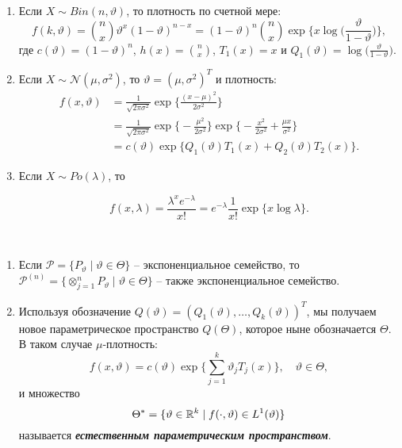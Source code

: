 \begin{exmp}\label{exmp2.34} \
	\begin{enumerate}
		\item Если $X \sim Bin(n, \vartheta)$, то плотность по счетной мере:
		\[ f(k, \vartheta)=\binom{n}{x} \vartheta^x(1-\vartheta)^{n-x}=(1-\vartheta)^n \binom{n}{x} \exp\Big\{x \log\Big(\frac{\vartheta}{1-\vartheta}\Big) \Big\},  \]
		где $c(\vartheta) = (1 - \vartheta)^n$, $h(x)=\binom{n}{x}$, $T_1(x) = x$ и $Q_1(\vartheta) = \log\Big(\frac{\vartheta}{1-\vartheta}\Big)$.
		\item Если $X \sim \mathcal{N}(\mu, \sigma^2)$, то $\vartheta=(\mu, \sigma^2)^T$ и плотность:
		\[ 
		\begin{aligned}
		f(x,\vartheta)&=\frac{1}{\sqrt{2 \pi \sigma^2}} \exp\Big\{ \frac{(x-\mu)^2}{2\sigma^2} \Big\} \\
		& = \frac{1}{\sqrt{2 \pi \sigma^2}} \exp \Big \{ -\frac{\mu^2}{2\sigma^2} \Big\}  \exp\Big \{ -\frac{x^2}{2\sigma^2} +\frac{\mu x}{\sigma^2} \Big\} \\
		& = c(\vartheta) \exp \Big\{ Q_1(\vartheta) T_1(x) + Q_2(\vartheta) T_2(x)  \Big \} .
		\end{aligned}  \]
		
		\item Если $X \sim Po(\lambda)$, то

		\[ f(x, \lambda) = \frac{\lambda^x e^{-\lambda}}{x!}=e^{-\lambda} \frac{1}{x!} \exp\{x \log \lambda \}. \]
    \end{enumerate}
\end{exmp}

\begin{rmrk}\
	\begin{enumerate}
		\item Если $\mathcal{P} = \{P_\vartheta \mid \vartheta \in \Theta \}$ -- экспоненциальное семейство, то $\mathcal{P}^{(n)}=\{ \otimes_{j=1}^n P_\vartheta \mid \vartheta \in \Theta \}$ -- также экспоненциальное семейство.
		\item Используя обозначение $Q(\vartheta) = (Q_1(\vartheta), \dots, Q_k(\vartheta))^T$, мы получаем новое параметрическое пространство $Q(\Theta)$, которое ныне обозначается $\Theta$. В таком случае $\mu$-плотность:
		\[f(x,\vartheta)=c(\vartheta) \exp \Big\{ \sum_{j=1}^k \vartheta_j T_j(x) \Big\}, \quad \vartheta \in \Theta, \]
		и множество
		\[ \Theta^* = \{ \vartheta \in \mathbb{R}^k \mid f(\cdot, \vartheta) \in L^1(\vartheta) \} \]
		называется \textbf{\textit{естественным параметрическим пространством}}.
	\end{enumerate}
\end{rmrk}


